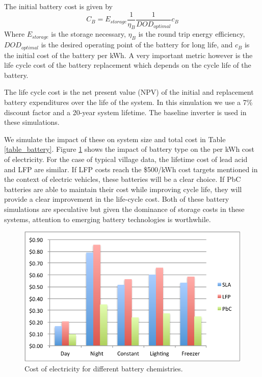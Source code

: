 \documentclass[conference]{IEEEtran}
\begin{document}
The initial battery cost is given by
%
$$ C_B = E_{storage} \frac{1}{\eta_B} \frac{1}{DOD_{optimal}} c_B $$
%
Where $E_{storage}$ is the storage necessary, $\eta_B$ is the
round trip energy efficiency, $DOD_{optimal}$ is the desired
operating point of the battery for long life, and $c_B$ is the
initial cost of the battery per kWh.
A very important metric however is the life cycle cost of the
battery replacement which depends on the cycle life of the battery.

The life cycle cost is the net present value (NPV) of the
initial and replacement battery expenditures over the life
of the system.
In this simulation we use a 7\% discount factor and a 20-year
system lifetime.
The baseline inverter is used in these simulations.

We simulate the impact of these on system size and total cost
in Table \ref{table_battery}.
Figure \ref{fig_battery} shows the impact of battery type on
the per kWh cost of electricity.
For the case of typical village data, the lifetime cost of
lead acid and LFP are similar.
If LFP costs reach the \$500/kWh cost targets mentioned in
the context of electric vehicles, these batteries will
be a clear choice.
If PbC batteries are able to maintain their cost while
improving cycle life, they will provide a clear improvement
in the life-cycle cost.
Both of these battery simulations are speculative but given
the dominance of storage costs in these systems, attention
to emerging battery technologies is worthwhile.

\begin{figure}[]
\begin{center}
\includegraphics[width=\columnwidth]{figures/battery.pdf}
\end{center}
\caption{Cost of electricity for different battery chemistries.}
\label{fig_battery}
\end{figure}
\end{document}
